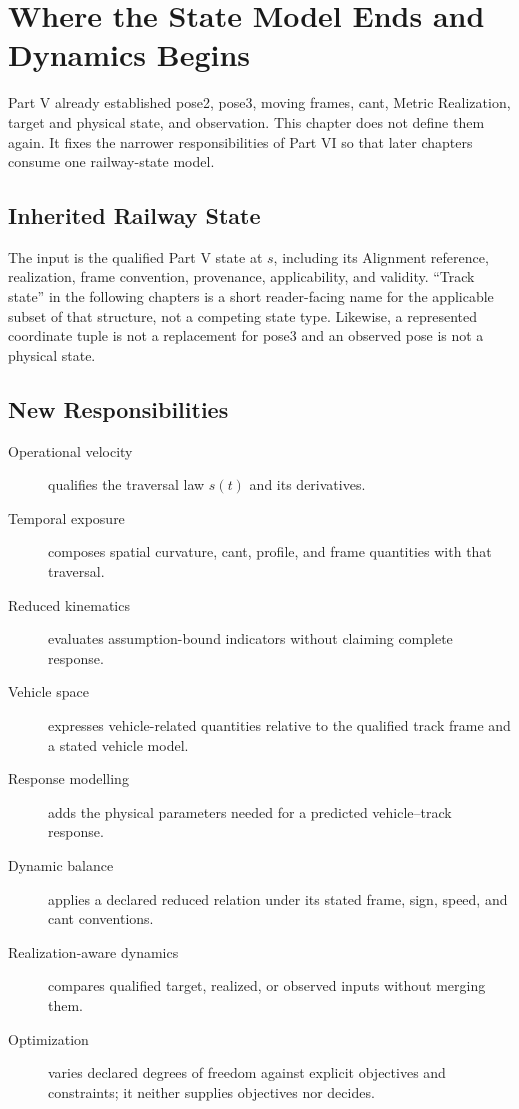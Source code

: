 \chapter{Where the State Model Ends and Dynamics Begins}
\label{chap:concept-boundaries}

Part V already established pose2, pose3, moving frames, cant, Metric
Realization, target and physical state, and observation. This chapter does not
define them again. It fixes the narrower responsibilities of Part VI so that
later chapters consume one railway-state model.

\section{Inherited Railway State}

The input is the qualified Part V state at \(s\), including its Alignment
reference, realization, frame convention, provenance, applicability, and
validity. ``Track state'' in the following chapters is a short reader-facing
name for the applicable subset of that structure, not a competing state type.
Likewise, a represented coordinate tuple is not a replacement for pose3 and an
observed pose is not a physical state.

\section{New Responsibilities}

\begin{description}
\item[Operational velocity] qualifies the traversal law \(s(t)\) and its
derivatives.
\item[Temporal exposure] composes spatial curvature, cant, profile, and frame
quantities with that traversal.
\item[Reduced kinematics] evaluates assumption-bound indicators without
claiming complete response.
\item[Vehicle space] expresses vehicle-related quantities relative to the
qualified track frame and a stated vehicle model.
\item[Response modelling] adds the physical parameters needed for a predicted
vehicle--track response.
\item[Dynamic balance] applies a declared reduced relation under its stated
frame, sign, speed, and cant conventions.
\item[Realization-aware dynamics] compares qualified target, realized, or
observed inputs without merging them.
\item[Optimization] varies declared degrees of freedom against explicit
objectives and constraints; it neither supplies objectives nor decides.
\end{description}

